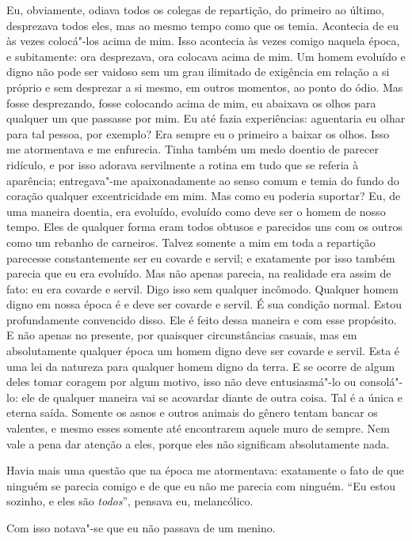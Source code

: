 Eu, obviamente, odiava todos os colegas de repartição, do primeiro ao
último, desprezava todos eles, mas ao mesmo tempo como que os temia.
Acontecia de eu às vezes colocá"-los acima de mim. Isso acontecia às
vezes comigo naquela época, e subitamente: ora desprezava, ora colocava
acima de mim. Um homem evoluído e digno não pode ser vaidoso sem um
grau ilimitado de exigência em relação a si próprio e sem desprezar a
si mesmo, em outros momentos, ao ponto do ódio. Mas fosse desprezando,
fosse colocando acima de mim, eu abaixava os olhos para qualquer um que
passasse por mim. Eu até fazia experiências: aguentaria eu olhar para
tal pessoa, por exemplo? Era sempre eu o primeiro a baixar os olhos.
Isso me atormentava e me enfurecia. Tinha também um medo doentio de
parecer ridículo, e por isso adorava servilmente a rotina em tudo que
se referia à aparência; entregava"-me apaixonadamente ao senso comum e
temia do fundo do coração qualquer excentricidade em mim. Mas como eu
poderia suportar? Eu, de uma maneira doentia, era evoluído, evoluído
como deve ser o homem de nosso tempo. Eles de qualquer forma eram todos
obtusos e parecidos uns com os outros como um rebanho de carneiros.
Talvez somente a mim em toda a repartição parecesse constantemente ser
eu covarde e servil; e exatamente por isso também parecia que eu
era evoluído. Mas não apenas parecia, na realidade era assim de fato:
eu era covarde e servil. Digo isso sem qualquer incômodo. Qualquer
homem digno em nossa época é e deve ser covarde e servil. É sua
condição normal. Estou profundamente convencido disso. Ele é feito
dessa maneira e com esse propósito. E não apenas no presente, por
quaisquer circunstâncias casuais, mas em absolutamente qualquer época
um homem digno deve ser covarde e servil. Esta é uma lei da natureza
para qualquer homem digno da terra. E se ocorre de algum deles tomar
coragem por algum motivo, isso não deve entusiasmá"-lo ou consolá"-lo:
ele de qualquer maneira vai se acovardar diante de outra coisa. Tal é a
única e eterna saída. Somente os asnos e outros animais do gênero
tentam bancar os valentes, e mesmo esses somente até encontrarem aquele
muro de sempre. Nem vale a pena dar atenção a eles, porque eles não
significam absolutamente nada.

Havia mais uma questão que na época me atormentava: exatamente o fato de
que ninguém se parecia comigo e de que eu não me parecia com ninguém.
“Eu estou sozinho, e eles são \textit{todos}”, pensava eu, melancólico.

Com isso notava"-se que eu não passava de um menino.

